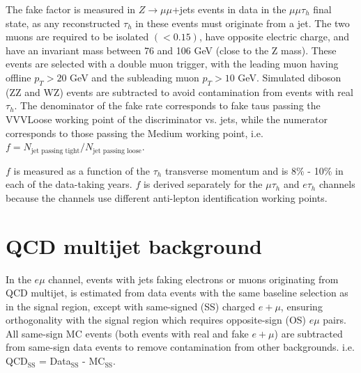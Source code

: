 The fake factor is measured in $Z \rightarrow \mu\mu$+jets events in data in the $\mu\mu\tau_{h}$ final state, as any reconstructed $\tau_{h}$ in these events must originate from a jet. The two muons are required to be isolated $(<0.15)$, have opposite electric charge, and have an invariant mass between 76 and 106 GeV (close to the Z mass). These events are selected with a double muon trigger, with the leading muon having offline $p_T > 20$ GeV and the subleading muon $p_{T} > 10$ GeV. Simulated diboson (ZZ and WZ) events are subtracted to avoid contamination from events with real $\tau_{h}$. The denominator of the fake rate corresponds to fake taus passing the VVVLoose working point of the discriminator vs. jets, while the numerator corresponds to those passing the Medium working point, i.e. $f = N_{\text{jet passing tight}}/ N_{\text{jet passing loose}}$.

$f$ is measured as a function of the $\tau_{h}$ transverse momentum and is 8\% - 10\% in each of the data-taking years. $f$ is derived separately for the $\mu\tau_{h}$ and $e\tau_{h}$ channels because the channels use different anti-lepton identification working points.

\section{QCD multijet background}
\label{section:ch-7-QCD-multijet-background}
In the $e\mu$ channel, events with jets faking electrons or muons originating from QCD multijet, is estimated from data events with the same baseline selection as in the signal region, except with same-signed (SS) charged $e+\mu$, ensuring orthogonality with the signal region which requires opposite-sign (OS) $e\mu$ pairs. All same-sign MC events (both events with real and fake $e+\mu$) are subtracted from same-sign data events to remove contamination from other backgrounds. i.e. QCD$_{\text{SS}}$ = Data$_{\text{SS}}$ - MC$_{\text{SS}}$.

